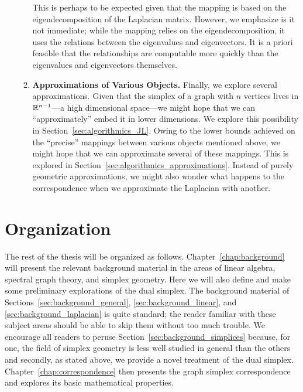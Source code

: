 \begin{itemize}
\begin{enumerate}
		This is perhaps to be expected given that the mapping is based on the eigendecomposition of the Laplacian matrix. 
		However, we emphasize is it not immediate; while the mapping relies on the eigendecomposition, it uses the relations between the eigenvalues and eigenvectors. It is a priori  feasible that the relationships are computable  more quickly than the eigenvalues and eigenvectors  themselves. 
		\item {\bf Approximations of Various Objects.} Finally, we explore several approximations. Given that  the simplex of a graph with $n$ vertices lives in $\mathbb{R}^{n-1}$---a high dimensional  space---we might hope that we can ``approximately'' embed it  in  lower dimensions. We explore this possibility in Section~\ref{sec:algorithmics_JL}. Owing to the lower bounds achieved on the ``precise'' mappings between various objects mentioned above, we might hope that we can approximate several of these mappings. This is explored in Section~\ref{sec:algorithmics_approximations}. 
		Instead of purely geometric approximations, we might also wonder what happens to the correspondence when we approximate the Laplacian with another. 
	\end{enumerate}

\end{itemize}

\section{Organization}
\label{sec:intro_organization}

The rest of the thesis will be  organized as follows. Chapter~\ref{chap:background} will present the relevant background material in the areas of linear algebra, spectral graph theory, and simplex  geometry. Here we will also define and make some preliminary explorations of the dual simplex. The  background material  of Sections~\ref{sec:background_general}, \ref{sec:background_linear},  and \ref{sec:background_laplacian} is quite standard; the reader familiar with  these subject areas should  be able to skip  them without too much trouble. We  encourage all readers to peruse Section~\ref{sec:background_simplices} because, for one, the field  of simplex geometry is  less  well  studied  in general than the others and secondly, as stated above, we provide a novel treatment of  the dual simplex. Chapter~\ref{chap:correspondence} then presents the  graph  simplex correspondence and explores its  basic mathematical properties.  









     

  	
